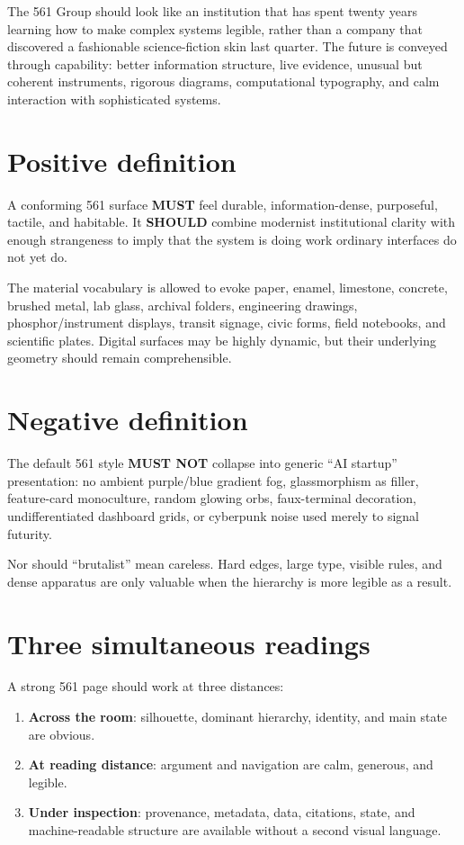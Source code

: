 \documentclass[11pt,twoside,openany]{report}
\newcommand{\MUST}{\textbf{MUST}\xspace}
\newcommand{\MUSTNOT}{\textbf{MUST NOT}\xspace}
\newcommand{\SHOULD}{\textbf{SHOULD}\xspace}
\begin{document}
\vspace{1em}

The 561 Group should look like an institution that has spent twenty years learning how to make complex systems legible, rather than a company that discovered a fashionable science-fiction skin last quarter. The future is conveyed through capability: better information structure, live evidence, unusual but coherent instruments, rigorous diagrams, computational typography, and calm interaction with sophisticated systems.

\section{Positive definition}
\begin{specbox}
A conforming 561 surface \MUST feel durable, information-dense, purposeful, tactile, and habitable. It \SHOULD combine modernist institutional clarity with enough strangeness to imply that the system is doing work ordinary interfaces do not yet do.
\end{specbox}

The material vocabulary is allowed to evoke paper, enamel, limestone, concrete, brushed metal, lab glass, archival folders, engineering drawings, phosphor/instrument displays, transit signage, civic forms, field notebooks, and scientific plates. Digital surfaces may be highly dynamic, but their underlying geometry should remain comprehensible.

\section{Negative definition}
\begin{alarmbox}
The default 561 style \MUSTNOT collapse into generic ``AI startup'' presentation: no ambient purple/blue gradient fog, glassmorphism as filler, feature-card monoculture, random glowing orbs, faux-terminal decoration, undifferentiated dashboard grids, or cyberpunk noise used merely to signal futurity.
\end{alarmbox}

Nor should ``brutalist'' mean careless. Hard edges, large type, visible rules, and dense apparatus are only valuable when the hierarchy is more legible as a result.

\section{Three simultaneous readings}
A strong 561 page should work at three distances:
\begin{enumerate}
  \item \textbf{Across the room}: silhouette, dominant hierarchy, identity, and main state are obvious.
  \item \textbf{At reading distance}: argument and navigation are calm, generous, and legible.
  \item \textbf{Under inspection}: provenance, metadata, data, citations, state, and machine-readable structure are available without a second visual language.
\end{enumerate}
\end{document}
